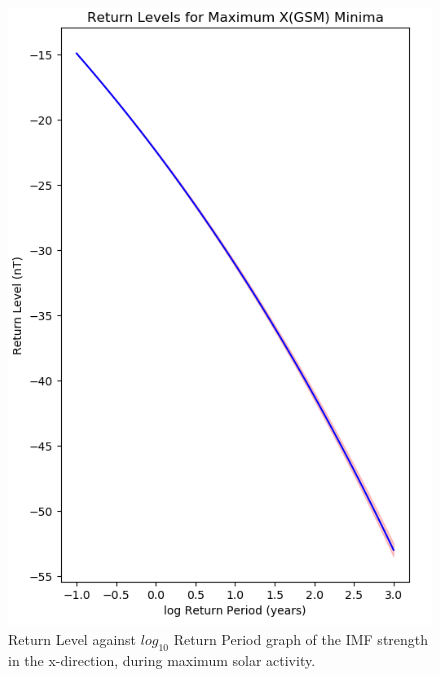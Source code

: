 \documentclass[11pt]{article}
\begin{document}
\begin{figure}[t!]
\begin{minipage}{0.48\textwidth}
                \centering
                \includegraphics[width=\textwidth]{fig_method/MFImaxXminReturn.png}
                \caption{Return Level against $log_{10}$ Return Period graph of the IMF strength in the x-direction, during maximum solar activity.}
                \label{fig:MFImaxXminReturn}
            \end{minipage}
        \end{figure}
\end{document}
